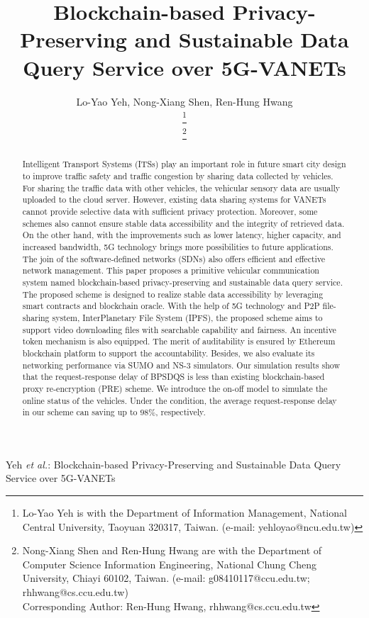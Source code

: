 \documentclass[journal,10pt]{IEEEtran}
\begin{document}
\title{Blockchain-based Privacy-Preserving and Sustainable Data Query Service over 5G-VANETs}

\author{Lo-Yao Yeh, Nong-Xiang Shen, Ren-Hung Hwang

\thanks{Lo-Yao Yeh is with the Department of Information Management, National Central University, Taoyuan 320317, Taiwan. (e-mail: yehloyao@ncu.edu.tw)}

\thanks{Nong-Xiang Shen and Ren-Hung Hwang are with the Department of Computer Science Information Engineering, National Chung Cheng University, Chiayi 60102, Taiwan. (e-mail: g08410117@ccu.edu.tw; rhhwang@cs.ccu.edu.tw)
\\ Corresponding Author: Ren-Hung Hwang,  rhhwang@cs.ccu.edu.tw}%
}

{Yeh \MakeLowercase{\textit{et al.}}:
Blockchain-based Privacy-Preserving and Sustainable Data Query Service over 5G-VANETs}

\maketitle

\begin{abstract}
Intelligent Transport Systems (ITSs) play an important role in future smart city design to improve traffic safety and traffic congestion by sharing data collected by vehicles. For sharing the traffic data with other vehicles, the vehicular sensory data are usually uploaded to the cloud server. However, existing data sharing systems for VANETs cannot provide selective data with sufficient privacy protection. Moreover, some schemes also cannot ensure stable data accessibility and the integrity of retrieved data. On the other hand, with the improvements such as lower latency, higher capacity, and increased bandwidth, 5G technology brings more possibilities to future applications. The join of the software-defined networks (SDNs) also offers efficient and effective network management. This paper proposes a primitive vehicular communication system named blockchain-based privacy-preserving and sustainable data query service. The proposed scheme is designed to realize stable data accessibility by leveraging smart contracts and blockchain oracle.
With the help of 5G technology and P2P file-sharing system, InterPlanetary File System (IPFS), the proposed scheme aims to support video downloading files with searchable capability and fairness. An incentive token mechanism is also equipped. The merit of auditability is ensured by Ethereum blockchain platform to support the accountability. Besides, we also evaluate its networking performance via SUMO and NS-3 simulators. Our simulation results show that the request-response delay of BPSDQS is less than existing blockchain-based proxy re-encryption (PRE) scheme. We introduce the on-off model to simulate the online status of the vehicles. Under the condition, the average request-response delay in our scheme can saving up to $98\%$, respectively. 
\end{abstract}
\end{document}
